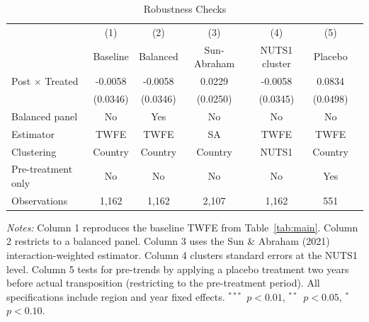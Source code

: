 \begin{table}[htbp]
\centering
\caption{Robustness Checks}
\label{tab:robustness}
\begin{tabular}{lcccccc}
\hline\hline
 & (1) & (2) & (3) & (4) & (5) \\
 & Baseline & Balanced & Sun-Abraham & NUTS1 cluster & Placebo \\
\hline
Post $\times$ Treated & -0.0058 & -0.0058 & 0.0229 & -0.0058 & 0.0834 \\
 & (0.0346) & (0.0346) & (0.0250) & (0.0345) & (0.0498) \\
\hline
Balanced panel & No & Yes & No & No & No \\
Estimator & TWFE & TWFE & SA & TWFE & TWFE \\
Clustering & Country & Country & Country & NUTS1 & Country \\
Pre-treatment only & No & No & No & No & Yes \\
Observations & 1,162 & 1,162 & 2,107 & 1,162 & 551 \\
\hline\hline
\end{tabular}
\begin{tablenotes}[flushleft]
\small
\item \textit{Notes:} Column 1 reproduces the baseline TWFE from Table~\ref{tab:main}. Column 2 restricts to a balanced panel. Column 3 uses the Sun \& Abraham (2021) interaction-weighted estimator. Column 4 clusters standard errors at the NUTS1 level. Column 5 tests for pre-trends by applying a placebo treatment two years before actual transposition (restricting to the pre-treatment period). All specifications include region and year fixed effects. $^{***}$~$p<0.01$, $^{**}$~$p<0.05$, $^{*}$~$p<0.10$.
\end{tablenotes}
\end{table}
